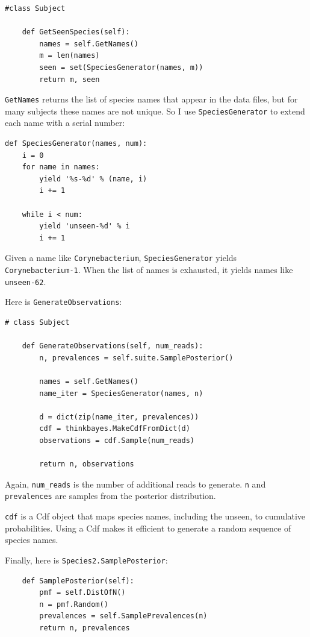\documentclass[12pt]{book}
\begin{document}
\begin{verbatim}
#class Subject

    def GetSeenSpecies(self):
        names = self.GetNames()
        m = len(names)
        seen = set(SpeciesGenerator(names, m))
        return m, seen
\end{verbatim}

{\tt GetNames} returns the list of species names that appear in
the data files, but for many subjects these names are not unique.
So I use {\tt SpeciesGenerator} to extend each name with a serial
number:

\begin{verbatim}
def SpeciesGenerator(names, num):
    i = 0
    for name in names:
        yield '%s-%d' % (name, i)
        i += 1

    while i < num:
        yield 'unseen-%d' % i
        i += 1
\end{verbatim}

Given a name like {\tt Corynebacterium}, {\tt SpeciesGenerator} yields
{\tt Corynebacterium-1}.  When the list of names is exhausted, it
yields names like {\tt unseen-62}.

Here is {\tt GenerateObservations}:

\begin{verbatim}
# class Subject

    def GenerateObservations(self, num_reads):
        n, prevalences = self.suite.SamplePosterior()

        names = self.GetNames()
        name_iter = SpeciesGenerator(names, n)

        d = dict(zip(name_iter, prevalences))
        cdf = thinkbayes.MakeCdfFromDict(d)
        observations = cdf.Sample(num_reads)

        return n, observations
\end{verbatim}

Again, \verb"num_reads" is the number of additional reads
to generate.  {\tt n} and {\tt prevalences} are samples from
the posterior distribution.

{\tt cdf} is a Cdf object that maps species names, including the
unseen, to cumulative probabilities.  Using a Cdf makes it efficient
to generate a random sequence of species names.

Finally, here is {\tt Species2.SamplePosterior}:

\begin{verbatim}
    def SamplePosterior(self):
        pmf = self.DistOfN()
        n = pmf.Random()
        prevalences = self.SamplePrevalences(n)
        return n, prevalences
\end{verbatim}
\end{document}
